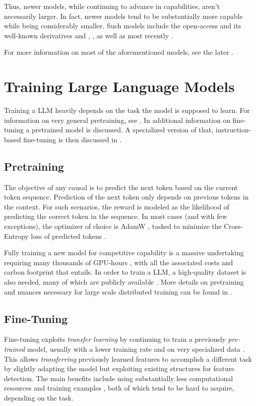 Thus, newer models, while continuing to advance in capabilities, aren't necessarily larger.
In fact, newer models tend to be substantially more capable while being considerably smaller.
Such models include the open-access  and its well-known derivatives  and , , as well as most recently .

For more information on most of the aforementioned models, see the later .


\section{Training Large Language Models}\label{sec:training}
Training a \acrlong{LLM} heavily depends on the task the model is supposed to learn. For information on very general pretraining, see . In  additional information on fine-tuning a pretrained model is discussed. A specialized version of that, instruction-based fine-tuning is then discussed in .


\subsection{Pretraining}\label{sub:pretraining}
The objective of any \gls{causal} is to predict the next token based on the current token sequence.
Prediction of the next token only depends on previous tokens in the context.
For such scenarios, the reward is modeled as the likelihood of predicting the correct token in the sequence.
In most cases (and with few exceptions), the optimizer of choice is AdamW \cite{loshchilov_decoupled_2017}, tasked to minimize the Cross-Entropy loss of predicted tokens \cite{naveed_comprehensive_2023}.

Fully training a new model for competitive capability is a massive undertaking requiring many thousands of GPU-hours \cite{touvron_llama_2023, scao_what_2022}, with all the associated costs and carbon footprint that entails.
In order to train a \gls{LLM}, a high-quality dataset is also needed, many of which are publicly available \cite{redpajamadata_2023}.
More details on pretraining and nuances necessary for large scale distributed training can be found in \cite{tirumala_d4_2023}.

\subsection{Fine-Tuning}\label{sub:finetune}
Fine-tuning exploits \textit{transfer learning} by continuing to train a previously \textit{pre-trained} model, usually with a lower training rate and on very specialized data \cite{gaddipati_comparative_2020}.
This allows \textit{transferring} previously learned features to accomplish a different task by slightly adapting the model but exploiting existing structures for feature detection.
The main benefits include using substantially less computational resources and training examples \cite{gaddipati_comparative_2020}, both of which tend to be hard to acquire, depending on the task.

